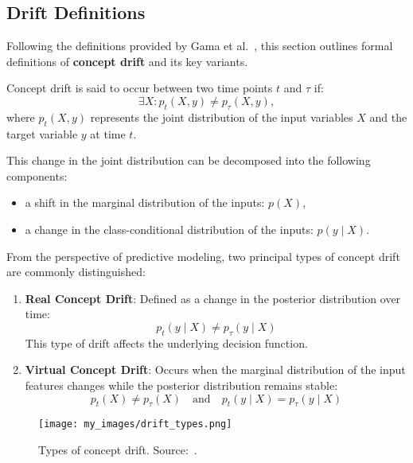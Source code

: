 \subsection*{Drift Definitions}\label{subsec:drift_definitions}
Following the definitions provided by Gama et
al.~\cite{drift_adaptation_survey}, this section outlines formal definitions of
\textbf{concept drift} and its key variants.

Concept drift is said to occur between two time points $t$ and $\tau$ if:
\begin{equation}
    \exists X : p_{t}(X, y) \neq p_{\tau}(X, y),
\end{equation}
where $p_t(X, y)$ represents the joint distribution of the input variables $X$
and the target variable $y$ at time $t$.

This change in the joint distribution can be decomposed into the following
components:
\begin{itemize}
    \item a shift in the marginal distribution of the inputs: $p(X)$,
    \item a change in the class-conditional distribution of the inputs: $p(y \mid X)$.
\end{itemize}

From the perspective of predictive modeling, two principal types of concept
drift are commonly distinguished:

\begin{enumerate}
    \item \textbf{Real Concept Drift}: Defined as a change in the posterior
          distribution over time:
          \begin{equation}
              p_{t}(y \mid X) \neq p_{\tau}(y \mid X)
          \end{equation}
          This type of drift affects the underlying decision function.

    \item \textbf{Virtual Concept Drift}: Occurs when the marginal distribution
          of the input features changes while the posterior distribution remains stable:
          \begin{equation}
              p_{t}(X) \neq p_{\tau}(X) \quad \text{and} \quad p_{t}(y \mid X) =
              p_{\tau}(y \mid X)
          \end{equation}
\end{enumerate}

\begin{figure}[H]
    \centering
    \texttt{[image: my\_images/drift\_types.png]}
    \caption{Types of concept drift. Source:~\cite{drift_adaptation_survey}.}\label{fig:concept_drift_types}
\end{figure}

